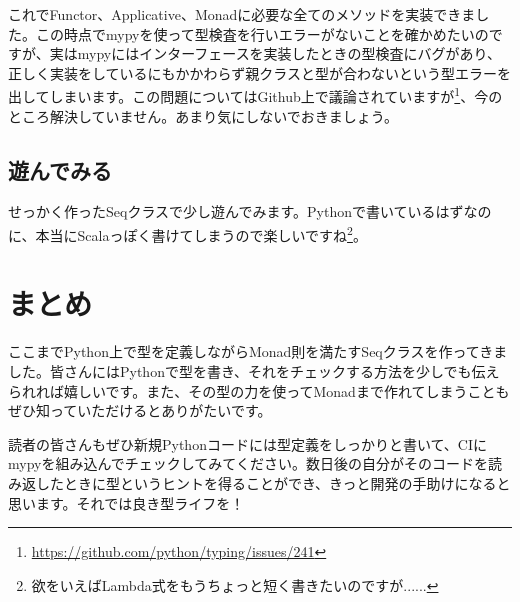 
これでFunctor、Applicative、Monadに必要な全てのメソッドを実装できました。この時点でmypyを使って型検査を行いエラーがないことを確かめたいのですが、実はmypyにはインターフェースを実装したときの型検査にバグがあり、正しく実装をしているにもかかわらず親クラスと型が合わないという型エラーを出してしまいます。この問題についてはGithub上で議論されていますが\footnote{\url{https://github.com/python/typing/issues/241}}、今のところ解決していません。あまり気にしないでおきましょう。

\subsection{遊んでみる}
せっかく作ったSeqクラスで少し遊んでみます。Pythonで書いているはずなのに、本当にScalaっぽく書けてしまうので楽しいですね\footnote{欲をいえばLambda式をもうちょっと短く書きたいのですが......}。


\section{まとめ}
ここまでPython上で型を定義しながらMonad則を満たすSeqクラスを作ってきました。皆さんにはPythonで型を書き、それをチェックする方法を少しでも伝えられれば嬉しいです。また、その型の力を使ってMonadまで作れてしまうこともぜひ知っていただけるとありがたいです。

読者の皆さんもぜひ新規Pythonコードには型定義をしっかりと書いて、CIにmypyを組み込んでチェックしてみてください。数日後の自分がそのコードを読み返したときに型というヒントを得ることができ、きっと開発の手助けになると思います。それでは良き型ライフを！